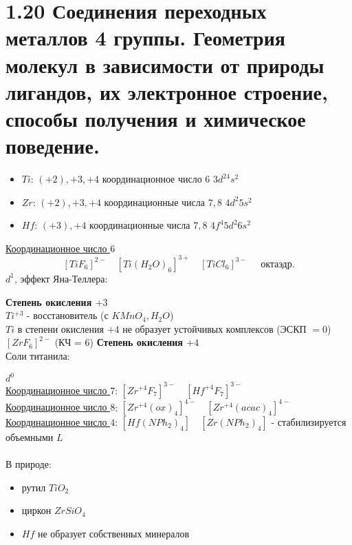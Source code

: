 \section*{1.20 Соединения переходных металлов 4 группы. Геометрия молекул в зависимости от природы лигандов, их электронное строение, способы получения и химическое поведение.}
\begin{itemize}
	\item $Ti$: $(+2), +3, +4$ \quad координационное число $6$ \quad $3d^24s^2$
	\item $Zr$: $(+2), +3, +4$ \quad координационные числа $7, 8$ \quad $4d^2 5s^2$
	\item $Hf$: $(+3), +4$ \quad координационные числа $7, 8$ \quad $4f^4 5d^2 6s^2$
\end{itemize}
\ul{Координационное число $6$}
\[
\left[TiF_6 \right]^{2-} \quad \left[Ti(H_2O)_6 \right]^{3+} \quad \left[TiCl_6 \right]^{3-} \quad \text{ октаэдр.}
\]
$d^1$, эффект Яна-Теллера:
\begin{figure} [H]
\end{figure}
\textbf{Степень окисления $+3$} \\
$Ti^{+3}$ - восстановитель (с $KMnO_4, H_2O$) \\
$Ti$ в степени окисления $+4$ не образует устойчивых комплексов (ЭСКП $= 0$) \\
$ \left[ZrF_6 \right]^{2-} $ (КЧ = $6$)
\textbf{Степень окисления $+4$} \\
Соли титанила:
\begin{figure} [H]
	\centering {\texttt{[image: aa1]}}
\end{figure}
$d^0$ \\
\ul{Координационное число $7$}: $ \left[Zr^{+4}F_7 \right]^{3-} \quad \left[Hf^{+4}F_7 \right]^{3-} $ \\
\ul{Координационное число $8$}: $ \left[Zr^{+4}(ox)_4 \right]^{4-} \quad \left[Zr^{+4}(acac)_4 \right]^{4-} $ \\
\ul{Координационное число $4$}: $ \left[Hf(NPh_2)_4 \right] \quad \left[Zr(NPh_2)_4 \right] $ - стабилизируется объемными $L$ \\ \\
В природе:
\begin{itemize}
	\item рутил $TiO_2$
	\item циркон $ZrSiO_4$
	\item $Hf$ не образует собственных минералов
\end{itemize}
